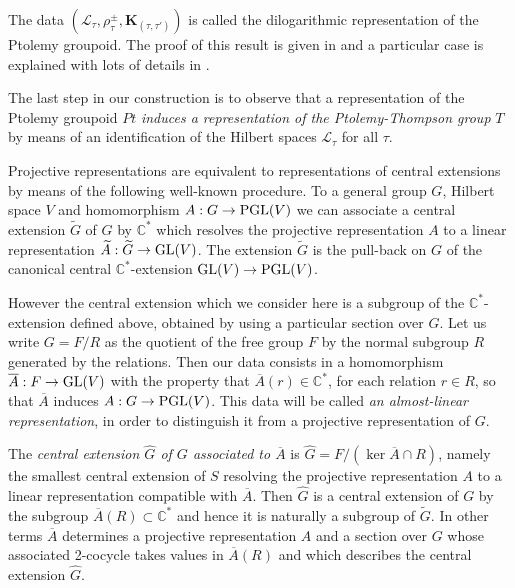 \documentclass[twoside]{irmaems}
\theoremstyle{plain}
\theoremstyle{definition}
\theoremstyle{remark}
\newcommand{\C}{{\mathbb{C}}}
\begin{document}
\vspace{0.2cm}
\noindent
The data $({\mathcal L}_{\tau}, \rho^{\pm}_{\tau}, {\mathbf K}_{(\tau,\tau')})$ is called  the dilogarithmic representation of the Ptolemy groupoid.  
The proof of this result is given in \cite{FG} and  a particular case is explained 
with lots of details  in \cite{Go}. 

\vspace{0.2cm}
\noindent
The last step in our construction is to observe that a 
representation of the Ptolemy groupoid 
$Pt$ {\em induces a representation of the Ptolemy-Thompson group} 
 $T$ by means of 
an identification of the Hilbert spaces ${\mathcal L}_{\tau}$ for all $\tau$. 


\vspace{0.2cm}
\noindent
Projective representations are equivalent to representations of 
central extensions by  means of the following well-known procedure.
To a general group $G$,  Hilbert space $V$ and homomorphism 
$A:G\to {\rm PGL}(V)$ we can associate a central extension $\widetilde{G}$ 
of $G$ by $\C^*$ which resolves the projective representation $A$ 
to a linear representation $\widetilde{A}:\widetilde{G}\to {\rm GL}(V)$. 
The extension $\widetilde{G}$ is the pull-back on $G$ of the 
canonical central $\C^*$-extension ${\rm GL}(V)\to {\rm PGL}(V)$. 

\vspace{0.2cm}
\noindent
However the central extension which we consider here is a subgroup 
of the $\C^*$-extension defined above, obtained by using 
a particular section over $G$. Let us 
write $G=F/R$ as the quotient of the free group $F$ by the normal 
subgroup $R$ generated by the relations.  Then our data 
consists in a homomorphism $\overline{A}:F\to {\rm GL}(V)$ with 
the property that $\overline{A}(r)\in\C^*$, for each 
relation $r\in R$, so that $\overline{A}$ induces $A:G\to {\rm PGL}(V)$. 
This data will  be called 
{\em an almost-linear representation}, in order to distinguish 
it from a  projective representation of $G$. 

\vspace{0.2cm}
\noindent
The {\em central extension $\widehat{G}$ of $G$ associated to 
$\overline{A}$} 
is $\widehat{G}=F/(\ker \overline{A}\cap R)$, namely the smallest  central 
extension  of $S$ resolving the projective representation $A$ to a linear 
representation compatible with $\overline{A}$. Then 
$\widehat{G}$ is a central extension of $G$ by the subgroup 
$\overline{A}(R)\subset \C^*$ and hence it is naturally a subgroup 
of $\widetilde{G}$. In other terms $\overline{A}$ determines a 
projective representation $A$ and a section over $G$ whose 
associated 2-cocycle takes values in $\overline{A}(R)$ and which 
describes the central extension $\widehat{G}$. 
\end{document}
